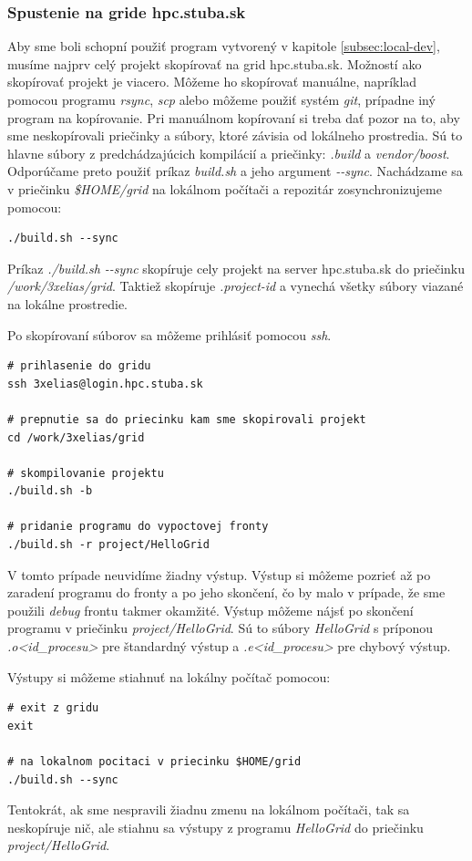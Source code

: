 \subsubsection{Spustenie na gride hpc.stuba.sk}
Aby sme boli schopní použiť program vytvorený v kapitole \ref{subsec:local-dev}, musíme najprv celý projekt skopírovať na grid hpc.stuba.sk.
Možností ako skopírovať projekt je viacero. Môžeme ho skopírovať manuálne, napríklad pomocou programu \textit{rsync}, \textit{scp}
alebo môžeme použiť systém \textit{git}, prípadne iný program na kopírovanie.
Pri manuálnom kopírovaní si treba dať pozor na to, aby sme neskopírovali priečinky a súbory, ktoré závisia od lokálneho prostredia.
Sú to hlavne súbory z predchádzajúcich kompilácií a priečinky: \textit{.build} a \textit{vendor/boost}. Odporúčame preto použiť príkaz \textit{build.sh} a jeho argument \textit{-{}-sync}.
Nachádzame sa v priečinku \textit{\$HOME/grid} na lokálnom počítači a repozitár zosynchronizujeme pomocou: 
\begin{lstlisting}
./build.sh --sync
\end{lstlisting}
Príkaz \textit{./build.sh -{}-sync} skopíruje cely projekt na server hpc.stuba.sk do priečinku
\\ \textit{/work/3xelias/grid}.
Taktiež skopíruje \textit{.project-id} a vynechá všetky súbory viazané na lokálne prostredie.

Po skopírovaní súborov sa môžeme prihlásiť pomocou \textit{ssh}.
\begin{lstlisting}
# prihlasenie do gridu
ssh 3xelias@login.hpc.stuba.sk

# prepnutie sa do priecinku kam sme skopirovali projekt
cd /work/3xelias/grid

# skompilovanie projektu
./build.sh -b

# pridanie programu do vypoctovej fronty
./build.sh -r project/HelloGrid
\end{lstlisting}
V tomto prípade neuvidíme žiadny výstup. Výstup si môžeme pozrieť až po zaradení programu do fronty a po jeho skončení, čo by malo v prípade, že sme použili \textit{debug} frontu takmer okamžité. Výstup môžeme nájsť po skončení programu v priečinku \textit{project/HelloGrid}. 
Sú to súbory \textit{HelloGrid} s príponou \textit{.o<id\_procesu>} pre štandardný výstup a \textit{.e<id\_procesu>} pre chybový výstup.

Výstupy si môžeme stiahnuť na lokálny počítač pomocou:
\begin{lstlisting}
# exit z gridu
exit
  
# na lokalnom pocitaci v priecinku $HOME/grid
./build.sh --sync
\end{lstlisting}
Tentokrát, ak sme nespravili žiadnu zmenu na lokálnom počítači, tak sa neskopíruje nič,
ale stiahnu sa výstupy z programu \textit{HelloGrid} do priečinku \textit{project/HelloGrid}.

